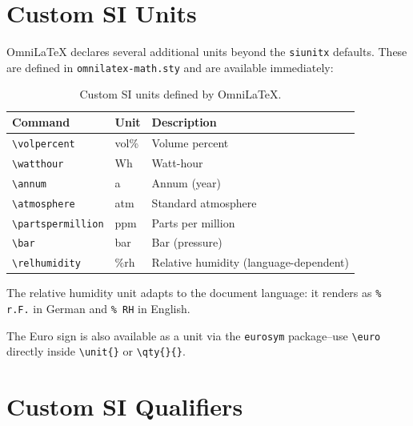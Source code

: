 \section{Custom SI Units}

OmniLaTeX declares several additional units beyond the \texttt{siunitx}
defaults.  These are defined in \texttt{omnilatex-math.sty} and are
available immediately:

\begin{table}[htbp]
  \centering
  \caption{Custom SI units defined by OmniLaTeX.}
  \label{tab:custom-units}
  \begin{tabular}{@{}llp{}@{}}
    \toprule
    Command & Unit & Description \\
    \midrule
    \texttt{\textbackslash volpercent}       & vol\%  & Volume percent \\
    \texttt{\textbackslash watthour}         & Wh     & Watt-hour \\
    \texttt{\textbackslash annum}            & a      & Annum (year) \\
    \texttt{\textbackslash atmosphere}       & atm    & Standard atmosphere \\
    \texttt{\textbackslash partspermillion}  & ppm    & Parts per million \\
    \texttt{\textbackslash bar}              & bar    & Bar (pressure) \\
    \texttt{\textbackslash relhumidity}      & \%rh   & Relative humidity (language-dependent) \\
    \bottomrule
  \end{tabular}
\end{table}

The relative humidity unit adapts to the document language: it renders as
\texttt{\%\,r.F.} in German and \texttt{\%\,RH} in English.

The Euro sign is also available as a unit via the \texttt{eurosym}
package--use \texttt{\textbackslash euro} directly inside
\texttt{\textbackslash unit\{\}} or \texttt{\textbackslash qty\{\}\{\}}.

\section{Custom SI Qualifiers}

